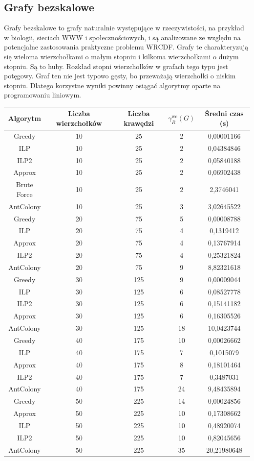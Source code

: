 \subsection{Grafy bezskalowe}

Grafy bezskalowe to grafy naturalnie występujące w rzeczywistości, na przykład w biologii, sieciach WWW i społecznościowych, i są analizowane ze względu na potencjalne zastosowania praktyczne problemu WRCDF. Grafy te charakteryzują się wieloma wierzchołkami o małym stopniu i kilkoma wierzchołkami o dużym stopniu. Są to huby. Rozkład stopni wierzchołków w grafach tego typu jest potęgowy. Graf ten nie jest typowo gęsty, bo przeważają wierzchołki o niskim stopniu. Dlatego korzystne wyniki powinny osiągać algorytmy oparte na programowaniu liniowym.

\begin{table}[H]
    \centering
    \begin{tabular}{|c|c|c|c|c|}
    \hline
    Algorytm & Liczba wierzchołków & Liczba krawędzi & $\gamma^{\text{wc}}_R(G)$ & Średni czas (s) \\
    \hline
    Greedy & 10 & 25 & 2 & 0,00001166 \\
    ILP & 10 & 25 & 2 & 0,04384846 \\
    ILP2 & 10 & 25 & 2 & 0,05840188 \\
    Approx & 10 & 25 & 2 & 0,06902438 \\
    Brute Force & 10 & 25 & 2 & 2,3746041 \\
    AntColony & 10 & 25 & 3 & 3,02645522 \\
     \hline
     Greedy & 20 & 75 & 5 & 0,00008788 \\
     ILP & 20 & 75 & 4 & 0,1319412 \\
     Approx & 20 & 75 & 4 & 0,13767914 \\
     ILP2 & 20 & 75 & 4 & 0,25321824 \\
     AntColony & 20 & 75 & 9 & 8,82321618 \\ 
    \hline
    Greedy & 30 & 125 & 9 & 0,00009044 \\
    ILP & 30 & 125 & 6 & 0,08527778 \\
    ILP2 & 30 & 125 & 6 & 0,15141182 \\
    Approx & 30 & 125 & 6 & 0,16305526 \\
    AntColony & 30 & 125 & 18 & 10,0423744 \\ 
    \hline
    Greedy & 40 & 175 & 10 & 0,00026662 \\
    ILP & 40 & 175 & 7 & 0,1015079 \\
    Approx & 40 & 175 & 8 & 0,18101464 \\
    ILP2 & 40 & 175 & 7 & 0,3487031 \\
    AntColony & 40 & 175 & 24 & 9,48435894 \\
    \hline
    Greedy & 50 & 225 & 14 & 0,00024856 \\
    Approx & 50 & 225 & 10 & 0,17308662 \\
    ILP & 50 & 225 & 10 & 0,48920074 \\
    ILP2 & 50 & 225 & 10 & 0,82045656 \\
    AntColony & 50 & 225 & 35 & 20,21980648 \\
    

\end{tabular}
\end{table}
